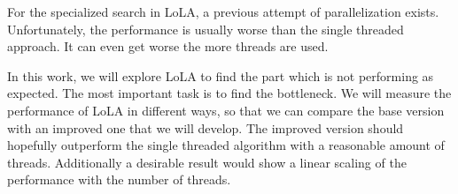 For the specialized search in LoLA, a previous attempt of parallelization exists. Unfortunately, the performance is usually worse than the single threaded approach. It can even get worse the more threads are used.

In this work, we will explore LoLA to find the part which is not performing as expected. The most important task is to find the bottleneck. We will measure the performance of LoLA in different ways, so that we can compare the base version with an improved one that we will develop. The improved version should hopefully outperform the single threaded algorithm with a reasonable amount of threads. Additionally a desirable result would show a linear scaling of the performance with the number of threads.



